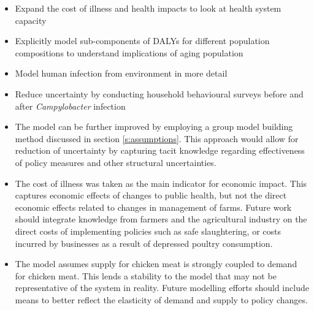 \begin{itemize}
    \item Expand the cost of illness and health impacts to look at health system capacity
    \item Explicitly model sub-components of DALYs for different population compositions to understand implications of aging population
    \item Model human infection from environment in more detail
    \item Reduce uncertainty by conducting household behavioural surveys before and after \textit{Campylobacter} infection
    \item The model can be further improved by employing a group model building method discussed in section \ref{s:assumptions}. This approach would allow for reduction of uncertainty by capturing tacit knowledge regarding effectiveness of policy measures and other structural uncertainties.
    \item The cost of illness was taken as the main indicator for economic impact. This captures economic effects of changes to public health, but not the direct economic effects related to changes in management of farms. Future work should integrate knowledge from farmers and the agricultural industry on the direct costs of implementing policies such as safe slaughtering, or costs incurred by businesses as a result of depressed poultry consumption.
    \item The model assumes supply for chicken meat is strongly coupled to demand for chicken meat. This lends a stability to the model that may not be representative of the system in reality. Future modelling efforts should include means to better reflect the elasticity of demand and supply to policy changes.
\end{itemize}

